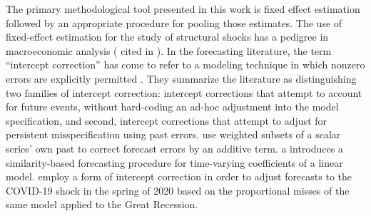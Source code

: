 \documentclass[11pt]{article}
\theoremstyle{definition}
\begin{document}

The primary methodological tool presented in this work is fixed effect estimation followed by an appropriate procedure for pooling those estimates.  The use of fixed-effect estimation for the study of structural shocks has a pedigree in macroeconomic analysis (\citet{romer1989does} cited in \citet{kilian2017structural}).  In the forecasting literature, the term ``intercept correction'' has come to refer to a modeling technique in which nonzero errors are explicitly permitted \citep{hendry1994theory, clements1998forecasting}.  They summarize the literature as distinguishing two families of intercept correction: intercept corrections that attempt to account for future events, without hard-coding an ad-hoc adjustment into the model specification, and second, intercept corrections that attempt to adjust for persistent misspecification using past errors.  \citet{guerron2017macroeconomic} use weighted subsets of a scalar series' own past to correct forecast errors by an additive term. \citet{dendramis2020similarity} a introduces a similarity-based forecasting procedure for time-varying coefficients of a linear model. \citet{foroni2022forecasting} employ a form of intercept correction in order to adjust forecasts to the COVID-19 shock in the spring of 2020 based on the proportional misses of the same model applied to the Great Recession.
\end{document}

